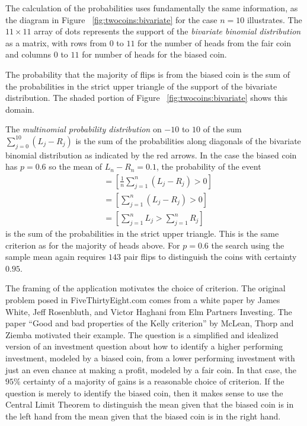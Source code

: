 \documentclass[12pt]{article}
\begin{document}
The calculation of the probabilities uses fundamentally the same
information, as the diagram in Figure~%
\ref{fig:twocoins:bivariate} for the case \( n = 10 \) illustrates.  The
\( 11 \times 11 \) array of dots represents the support of the \emph{bivariate
binomial distribution} as a matrix, with rows from \( 0 \) to \( 11 \)
for the number of heads from the fair coin and columns \( 0 \) to \( 11 \)
for number of heads for the biased coin.

The probability that the majority of flips is from the biased coin is
the sum of the probabilities in the strict upper triangle of the support
of the bivariate distribution.  The shaded portion of Figure~%
\ref{fig:twocoins:bivariate} shows this domain.

The \emph{multinomial probability distribution} on \( -10 \) to \( 10 \)
of the sum \( \sum\limits_{j=0}^{10} (L_j-R_j) \) is the sum of the
probabilities along diagonals of the bivariate binomial distribution as
indicated by the red arrows.  In the case the biased coin has \( p=0.6 \)
so the mean of \( L_n - R_n = 0.1 \), the probability of the event
\begin{align*}
    [S_n > 0] &= \left[\frac{1}{n} \sum\limits_{j=1}^n (L_j-R_j) > 0
    \right] \\
    &= \left[\sum\limits_{j=1}^n (L_j-R_j) > 0 \right] \\
    &= \left[\sum\limits_{j=1}^n L_j > \sum\limits_{j=1}^n R_j \right]
\end{align*}
is the sum of the probabilities in the strict upper triangle.  This is
the same criterion as for the majority of heads above.  For \( p = 0.6 \)
the search using the sample mean again requires \( 143 \) pair flips to
distinguish the coins with certainty \( 0.95 \).

The framing of the application motivates the choice of criterion.  The
original problem posed in FiveThirtyEight.com comes from a white paper
by James White, Jeff Rosenbluth, and Victor Haghani from Elm Partners
Investing.  The paper ``Good and bad properties of the Kelly criterion''
by McLean, Thorp and Ziemba motivated their example.  The question is a
simplified and idealized version of an investment question about how to
identify a higher performing investment, modeled by a biased coin, from
a lower performing investment with just an even chance at making a
profit, modeled by a fair coin.  In that case, the \( 95\% \) certainty
of a majority of gains is a reasonable choice of criterion.  If the
question is merely to identify the biased coin, then it makes sense to
use the Central Limit Theorem to distinguish the mean given that the
biased coin is in the left hand from the mean given that the biased coin
is in the right hand.
\end{document}
